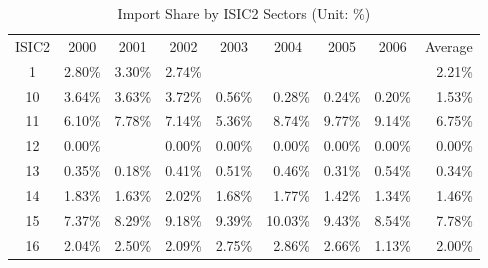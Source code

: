 \begin{table}[]
\begin{center}
\caption{Import Share by ISIC2 Sectors (Unit: \%)}
\label{ImpShare_ISIC2}
\begin{tabular}{crrrrrrrr}
\hline
ISIC2 & \multicolumn{1}{c}{2000} & \multicolumn{1}{c}{2001} & \multicolumn{1}{c}{2002} & \multicolumn{1}{c}{2003} & \multicolumn{1}{c}{2004} & \multicolumn{1}{c}{2005} & \multicolumn{1}{c}{2006} & \multicolumn{1}{c}{Average} \\
1     & 2.80\%                   & 3.30\%                   & 2.74\%                   &                          &                          &                          &                          & 2.21\%                      \\
10    & 3.64\%                   & 3.63\%                   & 3.72\%                   & 0.56\%                   & 0.28\%                   & 0.24\%                   & 0.20\%                   & 1.53\%                      \\
11    & 6.10\%                   & 7.78\%                   & 7.14\%                   & 5.36\%                   & 8.74\%                   & 9.77\%                   & 9.14\%                   & 6.75\%                      \\
12    & 0.00\%                   &                          & 0.00\%                   & 0.00\%                   & 0.00\%                   & 0.00\%                   & 0.00\%                   & 0.00\%                      \\
13    & 0.35\%                   & 0.18\%                   & 0.41\%                   & 0.51\%                   & 0.46\%                   & 0.31\%                   & 0.54\%                   & 0.34\%                      \\
14    & 1.83\%                   & 1.63\%                   & 2.02\%                   & 1.68\%                   & 1.77\%                   & 1.42\%                   & 1.34\%                   & 1.46\%                      \\
15    & 7.37\%                   & 8.29\%                   & 9.18\%                   & 9.39\%                   & 10.03\%                  & 9.43\%                   & 8.54\%                   & 7.78\%                      \\
16    & 2.04\%                   & 2.50\%                   & 2.09\%                   & 2.75\%                   & 2.86\%                   & 2.66\%                   & 1.13\%                   & 2.00\%                      \\

\end{tabular}
\end{center}
\end{table}
